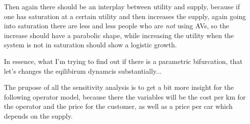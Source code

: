 Then again there should be an interplay between utility and supply, because
if one has saturation at a certain utility and then increases the supply, again
going into saturation there are less and less people who are \textit{not} using
AVs, so the increase should have a parabolic shape, while increasing the utility
when the system is not in saturation should show a logistic growth.

In essence, what I'm trying to find out if there is a parametric bifurcation, that
let's changes the eqilibirum dynamcis substantially...

The prupose of all the sensitivity analysis is to get a bit more insight for the
following operator model, because there the variables will be the cost per km
for the operator and the price for the customer, as well as a price per car which
depends on the supply.
